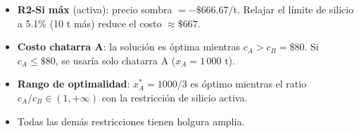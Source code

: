 \documentclass[12pt,a4paper]{article}
\begin{document}
\begin{sensbox}
\begin{itemize}[leftmargin=1.5em]
  \item \textbf{R2-Si máx} (activa): precio sombra $= -\$666.67$/t.
    Relajar el límite de silicio a 5.1\% (10 t más) reduce el costo $\approx\$667$.
  \item \textbf{Costo chatarra A}: la solución es óptima mientras $c_A > c_B = \$80$.
    Si $c_A \leq \$80$, se usaría solo chatarra A ($x_A = 1\,000$ t).
  \item \textbf{Rango de optimalidad}: $x_A^* = 1000/3$ es óptimo mientras
    el ratio $c_A/c_B \in (1, +\infty)$ con la restricción de silicio activa.
  \item Todas las demás restricciones tienen holgura amplia.
\end{itemize}
\end{sensbox}
\end{document}
